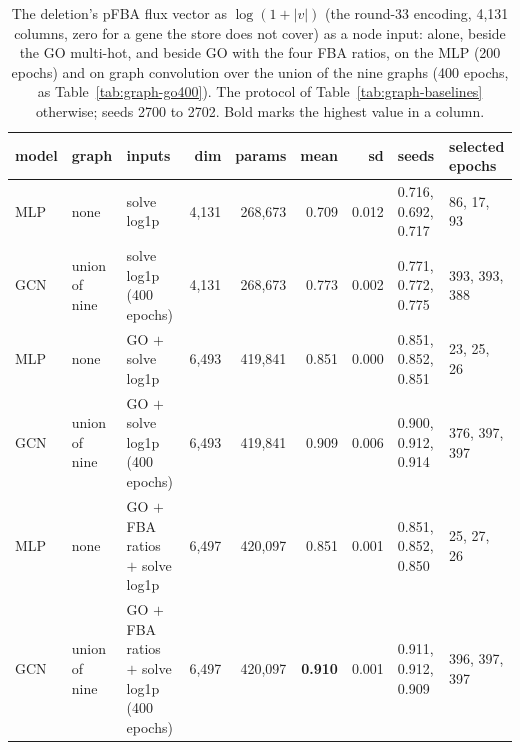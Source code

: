 \begin{table}[H]
  \centering
  \footnotesize
  \setlength{\tabcolsep}{3pt}
  \caption[One model over the annotation and the solve]{The deletion's pFBA flux vector as $\log(1 + |v|)$ (the round-33 encoding, 4,131 columns, zero for a gene the store does not cover) as a node input: alone, beside the GO multi-hot, and beside GO with the four FBA ratios, on the MLP (200 epochs) and on graph convolution over the union of the nine graphs (400 epochs, as Table~\ref{tab:graph-go400}). The protocol of Table~\ref{tab:graph-baselines} otherwise; seeds 2700 to 2702. Bold marks the highest value in a column.}
  \label{tab:graph-go-solve}
  \begin{tabular}{@{}lllrrrrll@{}}
    \hline
    model & graph & inputs & dim & params & mean & sd & seeds & selected epochs \\
    \hline
    MLP & none & solve log1p & 4,131 & 268,673 & 0.709 & 0.012 & 0.716, 0.692, 0.717 & 86, 17, 93 \\
    GCN & union of nine & solve log1p (400 epochs) & 4,131 & 268,673 & 0.773 & 0.002 & 0.771, 0.772, 0.775 & 393, 393, 388 \\
    MLP & none & GO $+$ solve log1p & 6,493 & 419,841 & 0.851 & 0.000 & 0.851, 0.852, 0.851 & 23, 25, 26 \\
    GCN & union of nine & GO $+$ solve log1p (400 epochs) & 6,493 & 419,841 & 0.909 & 0.006 & 0.900, 0.912, 0.914 & 376, 397, 397 \\
    MLP & none & GO $+$ FBA ratios $+$ solve log1p & 6,497 & 420,097 & 0.851 & 0.001 & 0.851, 0.852, 0.850 & 25, 27, 26 \\
    GCN & union of nine & GO $+$ FBA ratios $+$ solve log1p (400 epochs) & 6,497 & 420,097 & \textbf{0.910} & 0.001 & 0.911, 0.912, 0.909 & 396, 397, 397 \\
    \hline
  \end{tabular}
\end{table}
